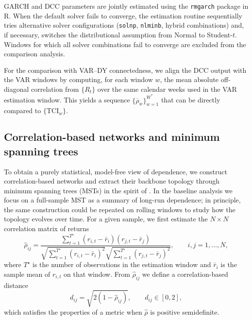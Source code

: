 GARCH and DCC parameters are jointly estimated using the \texttt{rmgarch} package in
\textsf{R}. When the default solver fails to converge, the estimation routine
sequentially tries alternative solver configurations (\texttt{solnp}, \texttt{nlminb},
hybrid combinations) and, if necessary, switches the distributional assumption from
Normal to Student-$t$. Windows for which all solver combinations fail to converge are
excluded from the comparison analysis.

For the comparison with VAR--DY connectedness, we align the DCC output with the VAR
windows by computing, for each window $w$, the mean absolute off-diagonal correlation
from $\{R_t\}$ over the same calendar weeks used in the VAR estimation window. This
yields a sequence $\{\overline{\rho}_w\}_{w=1}^{W^\ast}$ that can be directly compared
to $\{\mathrm{TCI}_w\}$.

\subsection{Correlation-based networks and minimum spanning trees}\label{subsec:mst}

To obtain a purely statistical, model-free view of dependence, we construct
correlation-based networks and extract their backbone topology through minimum spanning
trees (MSTs) in the spirit of \citet{Mantegna1999,MartiEtAl2020}. In the baseline
analysis we focus on a full-sample MST as a summary of long-run dependence; in principle,
the same construction could be repeated on rolling windows to study how the topology
evolves over time. For a given sample, we first estimate the $N \times N$ correlation
matrix of returns
\begin{equation}
  \hat{\rho}_{ij}
  = \frac{
      \sum_{t=1}^{T^\star} (r_{i,t} - \bar{r}_i)(r_{j,t} - \bar{r}_j)
    }{
      \sqrt{\sum_{t=1}^{T^\star} (r_{i,t} - \bar{r}_i)^2}
      \sqrt{\sum_{t=1}^{T^\star} (r_{j,t} - \bar{r}_j)^2}
    },
  \qquad i,j = 1,\dots,N,
\end{equation}
where $T^\star$ is the number of observations in the estimation window and $\bar{r}_i$ is
the sample mean of $r_{i,t}$ on that window. From $\hat{\rho}_{ij}$ we define a
correlation-based distance
\begin{equation}
  d_{ij}
  = \sqrt{2(1 - \hat{\rho}_{ij})},
  \qquad d_{ij} \in [0,2],
\end{equation}
which satisfies the properties of a metric when $\hat{\rho}$ is positive semidefinite.

